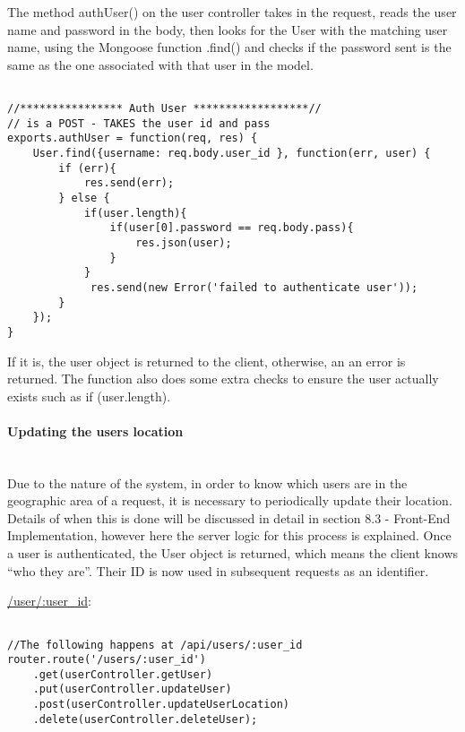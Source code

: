 \documentclass[a4paper]{article}
\newcommand{\subsubsubsection}[1]{\paragraph{#1}\mbox{}\\}
\begin{document}
The method authUser() on the user controller takes in the request, reads the user name and password in the body, then looks for the User with the matching user name, using the Mongoose function .find() and checks if the password sent is the same as the one associated with that user in the model.
\begin{lstlisting}[label=Authenticating a user,caption=Authenticating a user]

//**************** Auth User ******************//
// is a POST - TAKES the user id and pass
exports.authUser = function(req, res) {
    User.find({username: req.body.user_id }, function(err, user) {
        if (err){
            res.send(err);
        } else {
            if(user.length){
                if(user[0].password == req.body.pass){
                    res.json(user);           
                }
            }
             res.send(new Error('failed to authenticate user'));
        }
    });
}

\end{lstlisting}
If it is, the user object is returned to the client, otherwise, an  an error is returned.
The function also does some extra checks to ensure the user actually exists such as if (user.length).


\subsubsubsection{Updating the users location}
Due to the nature of the system, in order to know which users are in the geographic area of a request, it is necessary to periodically update their location. Details of when this is done will be discussed in detail in section 8.3 - Front-End Implementation, however here the server logic for this process is explained.
Once a user is authenticated, the User object is returned, which means the client knows ``who they are''. Their ID is now used in subsequent requests as an identifier.

\url{/user/:user_id}:
\begin{lstlisting}[label=Routes for known users,caption=Routes for known users]

//The following happens at /api/users/:user_id
router.route('/users/:user_id')
    .get(userController.getUser)
    .put(userController.updateUser)
    .post(userController.updateUserLocation)
    .delete(userController.deleteUser);
\end{lstlisting} 
\end{document}
